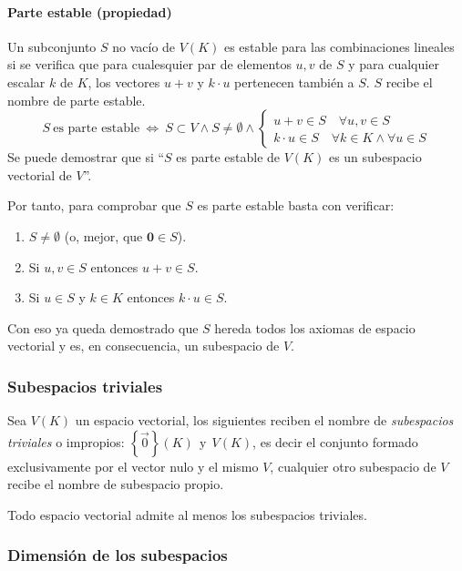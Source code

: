 \paragraph{Parte estable (propiedad)}

Un subconjunto \(S\) no vacío de \(V(K)\) es estable para las combinaciones lineales si se verifica que para cualesquier par de elementos \(u,v\) de \(S\) y para cualquier escalar \(k\) de \(K\), los vectores \(u+v\) y \(k\cdot u\) pertenecen también a \(S\). \(S\) recibe el nombre de parte estable.
\[
  S ~ \text{es parte estable} ~ \Longleftrightarrow ~ S \subset V \land S \neq \emptyset \land \begin{cases}
    u + v \in S \quad \forall u, v \in S\\
    k \cdot u \in S \quad \forall k \in K \land \forall u \in S
  \end{cases}
\]
Se puede demostrar que si ``\(S\) es parte estable de \(V(K)\) es un subespacio vectorial de \(V\)''.

Por tanto, para comprobar que \(S\) es parte estable basta con verificar:
\begin{enumerate}
  \item \(S\neq\emptyset\) (o, mejor, que \(\mathbf{0}\in S\)).
  \item Si \(u,v\in S\) entonces \(u+v\in S\).
  \item Si \(u\in S\) y \(k\in K\) entonces \(k\cdot u\in S\).
\end{enumerate}

Con eso ya queda demostrado que \(S\) hereda todos los axiomas de espacio vectorial y es, en consecuencia, un subespacio de \(V\).


\subsubsection{Subespacios triviales}

Sea \(V(K)\) un espacio vectorial, los siguientes reciben el nombre de \textit{subespacios triviales} o impropios: \(\left\{\vec{0}\right\} (K) ~~ \text{y} ~~ V(K)\), es decir el conjunto formado exclusivamente por el vector nulo y el mismo \(V\), cualquier otro subespacio de \(V\) recibe el nombre de subespacio propio.

Todo espacio vectorial admite al menos los subespacios triviales.

\subsubsection{Dimensión de los subespacios}

